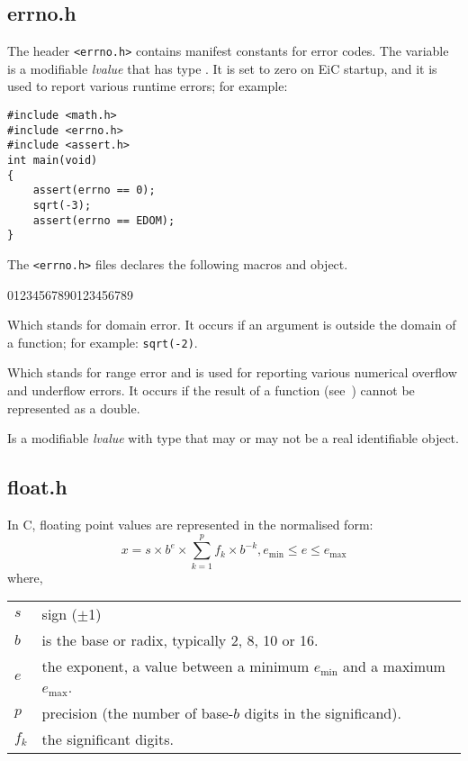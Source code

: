 \subsection{errno.h}
\label{sec:errnoh}


The header \verb+<errno.h>+ contains manifest constants for error
codes. The variable  is a modifiable {\it lvalue} that has
type . It is set to zero on EiC startup, and it is used to
report various runtime errors; for example:

\begin{production}
\begin{verbatim}
#include <math.h>
#include <errno.h>
#include <assert.h>
int main(void)
{
    assert(errno == 0);
    sqrt(-3);
    assert(errno == EDOM);
}
\end{verbatim}
\end{production}


The \verb+<errno.h>+ files declares the following macros and object.

\begin{Ventry2}{01234567890123456789 }

\item[EDOM]
\label{item:EDOM}
	Which stands for domain error. It occurs if an argument is
	outside the domain of a function; for example: \verb+sqrt(-2)+.

\item[ERANGE]
\label{item:ERANGE}
	Which stands for range error and is used for reporting various
	numerical overflow and underflow errors. It occurs if the
	result of a  function (see~) cannot
	be represented as a double.

\item[errno]
\label{item:ERRNO}
	Is a modifiable {\it lvalue} with type  that may
	or may not be a real identifiable object.

\end{Ventry2}




\subsection{float.h}
\label{sec:floath}


In C, floating point values are represented in the normalised form:
\[
	x = s \times b^e \times \sum^{p}_{k=1}f_{k}\times b^{-k}, e_{\min}\leq e \leq e_{\max}
\]
where, 
\begin{production}
\begin{tabular}{ll}
$s$ & sign ($\pm$1) \\
$b$ & is the base or radix, typically 2, 8, 10 or 16. \\
$e$ & the exponent, a value between a minimum $e_{\min}$ and a maximum $e_{\max}$. \\
$p$ & precision (the number of base-$b$ digits in the significand). \\
$f_k$ & the significant digits.
\end{tabular}
\end{production}

